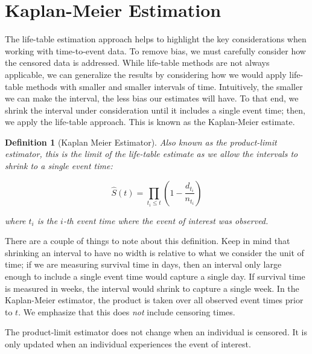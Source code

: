 \documentclass[
]{book}
\theoremstyle{plain}
\theoremstyle{mydefn}
\newtheorem{definition}{Definition}[chapter]
\theoremstyle{myexmpl}
\theoremstyle{remark}
\begin{document}
\hypertarget{kaplan-meier-estimation}{%
\section{Kaplan-Meier Estimation}\label{kaplan-meier-estimation}}

The life-table estimation approach helps to highlight the key considerations when working with time-to-event data. To remove bias, we must carefully consider how the censored data is addressed. While life-table methods are not always applicable, we can generalize the results by considering how we would apply life-table methods with smaller and smaller intervals of time. Intuitively, the smaller we can make the interval, the less bias our estimates will have. To that end, we shrink the interval under consideration until it includes a single event time; then, we apply the life-table approach. This is known as the Kaplan-Meier estimate.

\begin{definition}[Kaplan Meier Estimator]
\protect\hypertarget{def:defn-kaplan-meier}{}{\label{def:defn-kaplan-meier} {} }Also known as the product-limit estimator, this is the limit of the life-table estimate as we allow the intervals to shrink to a single event time:

\[\widehat{S}(t) = \prod_{t_i \leq t} \left(1 - \frac{d_{t_i}}{n_{t_i}}\right)\]

where \(t_i\) is the \(i\)-th event time where the event of interest was observed.\\
\end{definition}

There are a couple of things to note about this definition. Keep in mind that shrinking an interval to have no width is relative to what we consider the unit of time; if we are measuring survival time in days, then an interval only large enough to include a single event time would capture a single day. If survival time is measured in weeks, the interval would shrink to capture a single week. In the Kaplan-Meier estimator, the product is taken over all observed event times prior to \(t\). We emphasize that this does \emph{not} include censoring times.

\begin{rmdwarning}
The product-limit estimator does not change when an individual is censored. It is only updated when an individual experiences the event of interest.
\end{rmdwarning}
\end{document}
